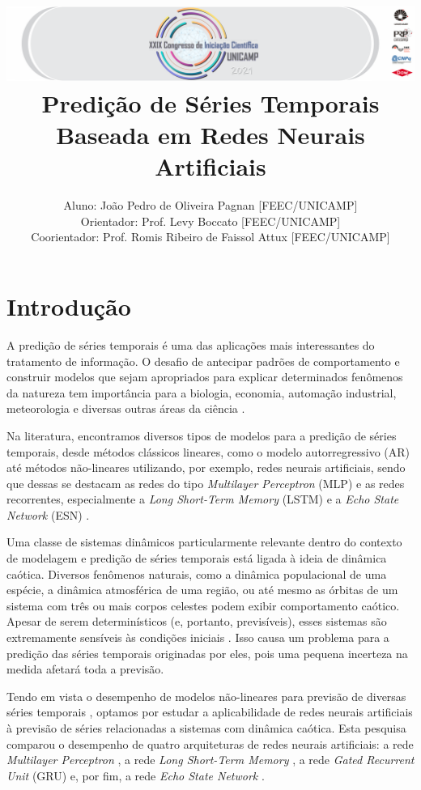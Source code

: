 \documentclass{article}
\title{{\noindent \includegraphics[scale = 0.5]{banner-grande.png}}\\ Predição de Séries Temporais Baseada em Redes Neurais
Artificiais}
\author{Aluno: João Pedro de Oliveira Pagnan [FEEC/UNICAMP]\\Orientador: Prof.  Levy Boccato [FEEC/UNICAMP]\\
Coorientador: Prof. Romis Ribeiro de Faissol Attux [FEEC/UNICAMP]}
\begin{document}

\section{Introdução}

A predição de séries temporais é uma das aplicações mais interessantes do tratamento de informação. O desafio de antecipar padrões de comportamento e construir modelos que sejam apropriados para explicar determinados fenômenos da natureza tem importância  para a biologia, economia, automação industrial, meteorologia e diversas outras áreas da ciência \cite{box2015time}.

Na literatura, encontramos diversos tipos de modelos para a  predição de séries temporais, desde métodos clássicos lineares, como o modelo autorregressivo (AR) \cite{box2015time} até métodos não-lineares utilizando, por exemplo, redes neurais artificiais, sendo que dessas se destacam as redes do tipo \textit{Multilayer Perceptron} (MLP) \cite{rosenblatt1958perceptron} e as redes recorrentes, especialmente a \textit{Long Short-Term Memory} (LSTM)  \cite{connor1994recurrent} e a \textit{Echo State Network} (ESN) \cite{jaeger2007echo}.

Uma classe de sistemas dinâmicos particularmente relevante dentro do contexto de modelagem e predição de séries temporais está ligada à ideia de dinâmica caótica. Diversos fenômenos naturais, como a dinâmica populacional de uma espécie, a dinâmica atmosférica de uma região, ou até mesmo as órbitas de um sistema com três ou mais corpos celestes podem exibir comportamento caótico. Apesar de serem determinísticos (e, portanto, previsíveis), esses sistemas são extremamente sensíveis às condições iniciais \cite{fiedler1994caos}. Isso causa um problema para a predição das séries temporais originadas por eles, pois uma pequena incerteza na medida afetará toda a previsão. 

Tendo em vista o desempenho de modelos não-lineares para previsão de diversas séries temporais \cite{connor1994recurrent}, optamos por estudar a aplicabilidade de redes neurais artificiais à previsão de séries relacionadas a sistemas com dinâmica caótica. Esta pesquisa comparou o desempenho de quatro arquiteturas de redes neurais artificiais: a rede \textit{Multilayer Perceptron} \cite{rosenblatt1958perceptron}, a rede \textit{Long Short-Term Memory} \cite{connor1994recurrent}, a rede \textit{Gated Recurrent Unit} (GRU) \cite{cho2014learning} e, por fim, a rede \textit{Echo State Network} \cite{jaeger2007echo}.
\end{document}
